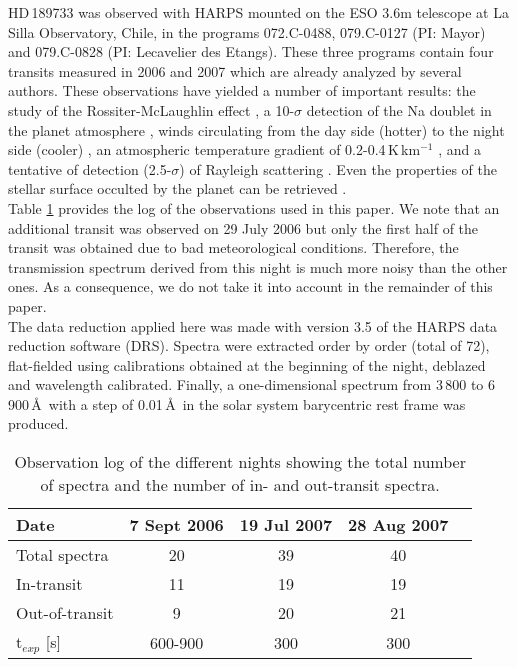 \documentclass{aa}
\begin{document}
\label{HARPS_obs}
HD\,189733  was observed with HARPS mounted on the ESO 3.6m telescope at La Silla Observatory, Chile, in the programs 072.C-0488, 079.C-0127 (PI: Mayor) and 079.C-0828 (PI: Lecavelier des Etangs). These three programs contain four transits measured in 2006 and 2007 which are already analyzed by several authors.
These observations have yielded a number of important results: the study of the Rossiter-McLaughlin effect \citep{triaud_rossiter-mclaughlin_2009}, a 10-$\sigma$ detection of the Na doublet in the planet atmosphere \citep{wyttenbach_spectrally_2015}, winds circulating from the day side (hotter) to the night side (cooler) \citep{wyttenbach_spectrally_2015,louden_spatially_2015}, an atmospheric temperature gradient of 0.2-0.4\,K\,km$^{-1}$ \citep{wyttenbach_spectrally_2015,heng_non-isothermal_2015}, and a tentative of detection (2.5-$\sigma$) of Rayleigh scattering  \citep{di_gloria_using_2015}. Even the properties of the stellar surface occulted by the planet can be retrieved \citep{collier_cameron_line-profile_2010,cegla_rossiter-mclaughlin_2016}.\\
Table \ref{observation hd189733} provides the log of the observations used in this paper.
We note that an additional transit was observed on 29 July 2006 but only the first half of the transit was obtained due to bad meteorological conditions. Therefore, the transmission spectrum derived from this night is much more noisy than the other ones. As a consequence, we do not take it into account in the remainder of this paper. \\
The data reduction applied here was made with version 3.5 of the HARPS data reduction software (DRS). Spectra were extracted order by order (total of 72), flat-fielded using calibrations obtained at the beginning of the night, deblazed and wavelength calibrated. Finally, a one-dimensional spectrum from 3\,800 to 6\,900\,\AA\ with a step of 0.01\,\AA\ in the solar system barycentric rest frame was produced.


\begin{table}[h]
\centering
\caption{Observation log of the different nights showing the total number of spectra and the number of in- and out-transit spectra.}
\begin{tabular}{lcccc}
\hline
Date & 7 Sept 2006 & 19 Jul 2007 & 28 Aug 2007\\
\hline
Total spectra & 20 & 39 & 40 \\
In-transit & 11 & 19 & 19 \\
Out-of-transit & 9 & 20 & 21 \\
 t$_{exp}$ [s] & 600-900  & 300 & 300 \\
\hline
\end{tabular}
\label{observation hd189733}
\end{table}
		
\end{document}
